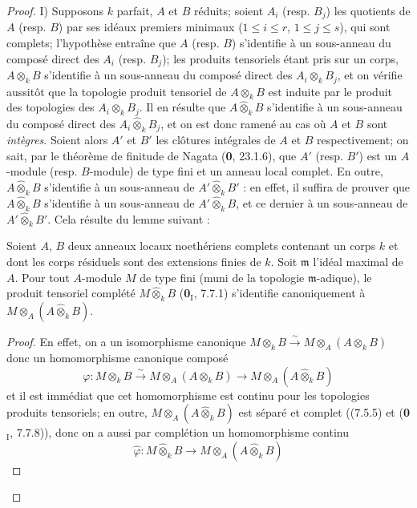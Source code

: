 \begin{proof}
I) Supposons $k$ parfait, $A$ et $B$ réduits; soient $A_i$ (resp. $B_j$) les
quotients de $A$ (resp. $B$) par ses idéaux premiers minimaux
($1\leq i\leq r$, $1\leq j\leq s$), qui sont complets; l'hypothèse entraîne
que $A$ (resp. $B$) s'identifie à un sous-anneau du composé direct des $A_i$
(resp. $B_j$); les produits tensoriels étant pris sur un corps,
$A\otimes_kB$ s'identifie à un sous-anneau du composé direct des
$A_i\otimes_kB_j$, et on vérifie aussitôt que la topologie produit tensoriel
de $A\otimes_kB$ est induite par le produit des topologies des
$A_i\otimes_kB_j$. Il en résulte que $A\widehat\otimes_kB$ s'identifie à un
sous-anneau du composé direct des $A_i\widehat\otimes_kB_j$, et on est donc
ramené au cas où $A$ et $B$ sont \emph{intègres}. Soient alors $A'$ et $B'$ les
clôtures intégrales de $A$ et $B$ respectivement; on sait, par le théorème de
finitude de Nagata (\textbf{0}, 23.1.6), que $A'$ (resp. $B'$) est un $A$-module (resp.
$B$-module) de type fini et un anneau local complet. En outre,
$A\widehat\otimes_kB$ s'identifie à un sous-anneau de
$A'\widehat\otimes_kB'$ : en effet, il suffira de prouver que
$A\widehat\otimes_kB$ s'identifie à un sous-anneau de
$A'\widehat\otimes_kB$, et ce dernier à un sous-anneau de
$A'\widehat\otimes_kB'$. Cela résulte du lemme suivant :

\begin{lemma}[7.5.7.1]
\label{IV.2.s7.5.7.1-fr}
Soient $A$, $B$ deux anneaux locaux noethériens complets contenant un corps
$k$ et dont les corps résiduels sont des extensions finies de $k$. Soit
$\mathfrak m$ l'idéal maximal de $A$. Pour tout $A$-module $M$ de type fini
(muni de la topologie $\mathfrak m$-adique), le produit tensoriel complété
$M\widehat\otimes_kB$ \textup{(\textbf{0}$_{\mathrm I}$, 7.7.1)} s'identifie canoniquement à
$M\otimes_A(A\widehat\otimes_kB)$.
\end{lemma}

\begin{proof}
En effet, on a un isomorphisme canonique
$M\otimes_kB\xrightarrow{\sim}M\otimes_A(A\otimes_kB)$ donc un homomorphisme
canonique composé
\[
\varphi:M\otimes_kB\xrightarrow{\sim}M\otimes_A(A\otimes_kB)
\longrightarrow M\otimes_A(A\widehat\otimes_kB)
\]
et il est immédiat que cet homomorphisme est continu pour les topologies
produits tensoriels; en outre, $M\otimes_A(A\widehat\otimes_kB)$ est séparé et
complet ((7.5.5) et (\textbf{0}$_{\mathrm I}$, 7.7.8)), donc on a aussi par complétion
un homomorphisme continu
\[
\widehat\varphi:M\widehat\otimes_kB\longrightarrow
M\otimes_A(A\widehat\otimes_kB)
\]


\end{proof}
\end{proof}
